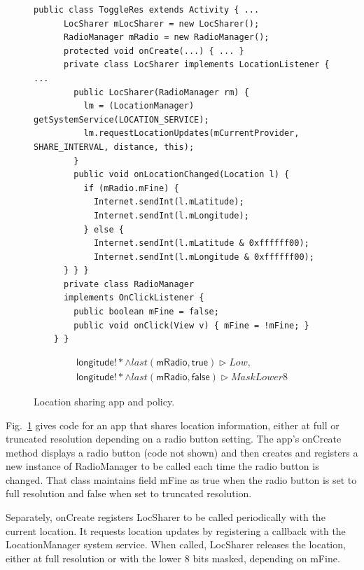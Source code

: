 \documentclass{llncs}
\newcommand{\code}[1]{\textsf{#1}} %
\newcommand{\tlast}[2]{\textit{last}(#1, #2)}
\begin{document}
\begin{figure}[t]
  \centering
  \begin{lstlisting}[name=Ex]
    public class ToggleRes extends Activity { ...
      LocSharer mLocSharer = new LocSharer();
      RadioManager mRadio = new RadioManager();
      protected void onCreate(...) { ... }
      private class LocSharer implements LocationListener { ... 
        public LocSharer(RadioManager rm) {
          lm = (LocationManager) getSystemService(LOCATION_SERVICE);
          lm.requestLocationUpdates(mCurrentProvider, SHARE_INTERVAL, distance, this);
        }
        public void onLocationChanged(Location l) {
          if (mRadio.mFine) {
            Internet.sendInt(l.mLatitude);
            Internet.sendInt(l.mLongitude);
          } else {
            Internet.sendInt(l.mLatitude & 0xffffff00);
            Internet.sendInt(l.mLongitude & 0xffffff00);
      } } }
      private class RadioManager
      implements OnClickListener {
        public boolean mFine = false;
        public void onClick(View v) { mFine = !mFine; }
    } }
  \end{lstlisting}
  \begin{displaymath}
    \begin{array}{ll}
      \code{longitude}!\ast \wedge
      \tlast{\code{mRadio}}{\code{true}} \rhd
      \textit{Low}, \\
      \code{longitude}!\ast \wedge
      \tlast{\code{mRadio}}{\code{false}} \rhd
      \textit{MaskLower8}
    \end{array}
  \end{displaymath}
  \caption{Location sharing app and policy.}
  \label{fig:app-loc-toggle}
\end{figure}

Fig.~\ref{fig:app-loc-toggle} gives code for an app that
shares location information, either at full or truncated resolution
depending on a radio button setting. The app's \code{onCreate}
method displays a radio button (code not shown) and then creates and
registers a new instance of \code{RadioManager} to be called
each time the radio button is changed. That
class maintains field \code{mFine} as \code{true} when the radio button is
set to full resolution and \code{false} when set to truncated
resolution.

Separately, \code{onCreate} registers \code{LocSharer} to be called
periodically with the current location.  It requests location updates
by registering a callback with the \code{LocationManager}
system service.  When called, \code{LocSharer} releases the
location, either at full resolution or with the lower 8 bits
masked, depending on \code{mFine}.
\end{document}
